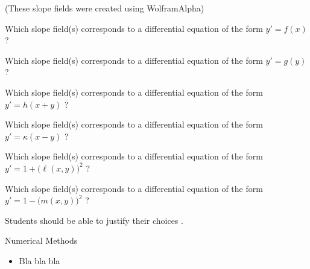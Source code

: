 \hfill {\footnotesize(These slope fields were created using WolframAlpha)} \\


\begin{parts}
	\item Which slope field(s) corresponds to a differential equation of the form
		\qquad $y'=f(x)$ \qquad ?	

	\item Which slope field(s) corresponds to a differential equation of the form
		\qquad $y'=g(y)$ \qquad ?	

	\item Which slope field(s) corresponds to a differential equation of the form
		\qquad $y'=h(x+y)$ \qquad ?	

	\item Which slope field(s) corresponds to a differential equation of the form
		\qquad $y'=\kappa(x-y)$ \qquad ?	

	\item Which slope field(s) corresponds to a differential equation of the form
		\qquad $y'=1+\big( \ell(x,y) \big)^2$ \qquad ?	

	\item Which slope field(s) corresponds to a differential equation of the form
		\qquad $y'=1-\big( m(x,y) \big)^2$ \qquad ?	

\end{parts}

\begin{annotation}
	\begin{Goals}
		Students should be able to justify their choices	.
	\end{Goals}
	
\end{annotation}






\newpage






\begin{module}{Numerical Methods}	
	\begin{itemize}
		\item Bla bla bla	
	\end{itemize}
	


\end{module}





